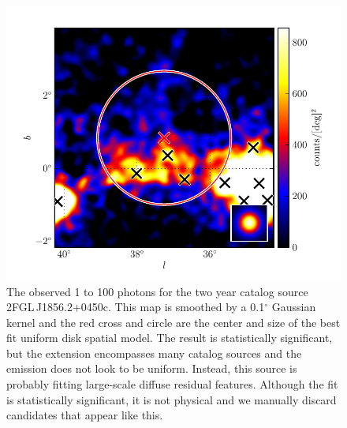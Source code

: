 \documentclass[12pt,preprint]{aastex}
\newcommand{\gev}{\text{GeV}\xspace}
\renewcommand{\deg}{\ensuremath{^\circ}\xspace}
\begin{document}
\clearpage
\begin{figure}
  \begin{center}
    \includegraphics{source_plots/example_bad_fit.pdf}
    \caption{
    The observed 1 \gev to 100 \gev photons for the two year catalog
    source 2FGL\,J1856.2+0450c. This map is smoothed by a 0.1\deg Gaussian
    kernel and the red cross and circle are the center and size of the
    best fit uniform disk spatial model. The result is statistically
    significant, but the extension encompasses many catalog sources and
    the emission does not look to be uniform. Instead, this source is
    probably fitting large-scale diffuse residual features. Although the
    fit is statistically significant, it is not physical and we manually
    discard candidates that appear like this.
    }
    \label{example_bad_fit}
  \end{center}
\end{figure}
\end{document}
